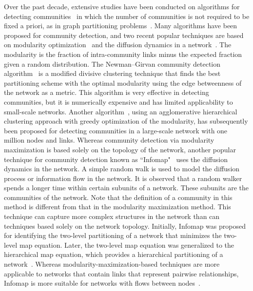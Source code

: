 \documentclass[pre,floatfix,twocolumn,showpacs,a4paper,nofootinbib]{revtex4}
\begin{document}
Over the past decade, extensive studies have been conducted on algorithms for detecting communities~\cite{fortunato2010community, newman2012communities} in which the
number of communities is not required to be fixed a priori, as in graph partitioning problems~\cite{kernighan1970efficient}. 
Many algorithms have been proposed for community detection, and two recent popular techniques are based on modularity optimization~\cite{newman2004finding, newman2004fast}
and the diffusion dynamics in a network~\cite{rosvall2007information,rosvall2008maps}. The modularity is the fraction of intra-community links minus the expected fraction 
given a random distribution. The Newman–Girvan community detection algorithm~\cite{newman2004finding} is a modified divisive clustering technique that 
finds the best partitioning scheme with the optimal modularity using the edge betweenness of the network as a metric.  
This algorithm is very effective in detecting communities, but it is numerically expensive and has limited applicability to small-scale networks. 
Another algorithm~\cite{clauset2004finding}, using an agglomerative hierarchical clustering approach with greedy optimization of the modularity,
has subsequently been proposed for detecting communities in a large-scale network with one million nodes and links. Whereas community detection via modularity 
maximization is based solely on the topology of the network, another popular technique for community detection known as 
``Infomap"~\cite{rosvall2007information,rosvall2008maps} uses the diffusion dynamics in the network. A simple random walk is used to model the diffusion process or
information flow in the network. It is observed that a random walker spends a longer
time within certain subunits of a network. These subunits are the communities of the network. 
Note that the definition of a community in this method is different from that in the modularity maximization method. This technique can capture more complex structures in the network
than can techniques based solely on the network topology. Initially, Infomap was proposed for identifying the two-level partitioning of a network that
minimizes the two-level map equation. Later, the two-level map equation was generalized to the hierarchical map equation, which provides a hierarchical partitioning of a
network~\cite{rosvall2011multilevel}. Whereas modularity-maximization-based techniques are more 
applicable to networks that contain links that represent pairwise relationships, Infomap is more suitable for networks with flows between
nodes~\cite{rosvall2008maps}. 
\end{document}
